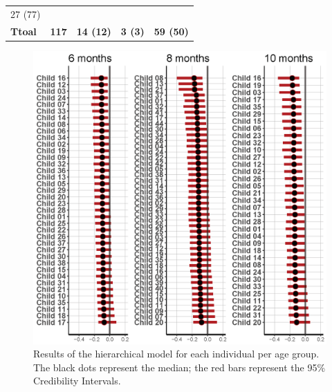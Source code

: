 \documentclass[openright,titlepage,12pt,a4paper]{book}
\begin{document}
\begin{longtable}[]{@{}llclc@{}}
\begin{minipage}[t]{0.28\columnwidth}
27 (77)\strut
\end{minipage}\tabularnewline
\begin{minipage}[t]{0.09\columnwidth}\raggedright
\textbf{Ttoal}\strut
\end{minipage} & \begin{minipage}[t]{0.15\columnwidth}\raggedright
\textbf{117}\strut
\end{minipage} & \begin{minipage}[t]{0.16\columnwidth}\centering
\textbf{14 (12)}\strut
\end{minipage} & \begin{minipage}[t]{0.16\columnwidth}\raggedright
\textbf{3 (3)}\strut
\end{minipage} & \begin{minipage}[t]{0.28\columnwidth}\centering
\textbf{59 (50)}\strut
\end{minipage}\tabularnewline
\bottomrule
\end{longtable}

\newpage

\begin{figure}

{\centering \includegraphics[width=0.9\linewidth]{figures/chapter_4/Figure5} 

}

\caption{Results of the hierarchical model for each individual per age group. The black dots represent the median; the red bars represent the 95\% Credibility Intervals.}\label{fig:ch04fig5}
\end{figure}
\end{document}
